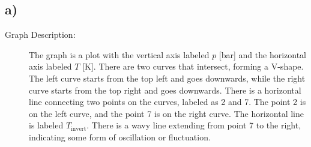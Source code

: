 

\subsection*{a)}
\begin{description}
    \item[Graph Description:] The graph is a plot with the vertical axis labeled \( p \) [bar] and the horizontal axis labeled \( T \) [K]. There are two curves that intersect, forming a V-shape. The left curve starts from the top left and goes downwards, while the right curve starts from the top right and goes downwards. There is a horizontal line connecting two points on the curves, labeled as 2 and 7. The point 2 is on the left curve, and the point 7 is on the right curve. The horizontal line is labeled \( T_{\text{invert}} \). There is a wavy line extending from point 7 to the right, indicating some form of oscillation or fluctuation.
\end{description}